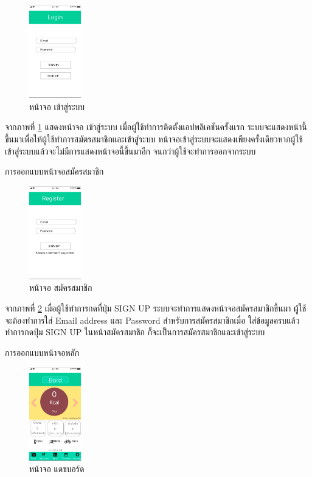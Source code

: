 				\begin{figure}[H]
					\centering
					\includegraphics[width=0.2\textwidth]{Figures/3/UIDESIGN/1}
					\caption{หน้าจอ เข้าสู่ระบบ}
					\label{Fig:1}
				\end{figure}
				จากภาพที่ \ref{Fig:1} แสดงหน้าจอ เข้าสู่ระบบ เมื่อผู้ใช้ทำการติดตั้งแอปพลิเคชันครั้งแรก ระบบจะแสดงหน้านี้ขึ้นมาเพื่อให้ผู้ใช้ทำการสมัตรสมาชิกและเข้าสู่ระบบ
				หน้าจอเข้าสู่ระบบจะแสดงเพียงครั้งเดียวหากผู้ใช้เข้าสู่ระบบแล้วจะไม่มีการแสดงหน้าจอนี้ขึ้นมาอีก จนกว่าผู้ใช้จะทำการออกจากระบบ
\item การออกแบบหน้าจอสมัครสมาชิก 
	\begin{figure}[H]
					\centering
					\includegraphics[width=0.2\textwidth]{Figures/3/UIDESIGN/2}
					\caption{หน้าจอ สมัครสมาชิก}
					\label{Fig:2}
				\end{figure}
				จากภาพที่ \ref{Fig:2} เมื่อผู้ใช้ทำการกดที่ปุ่ม SIGN UP ระบบจะทำการแสดงหน้าจอสมัครสมาชิกขึ้นมา ผู้ใช้จะต้องทำการใส่ Email address และ Password สำหรับการสมัครสมาชิกเมื่อ
				ใส่ข้อมูลครบแล้วทำการกดปุ่ม SIGN UP ในหน้าสมัครสมาชิก ก็จะเป็นการสมัครสมาชิกและเข้าสู่ระบบ
\item การออกแบบหน้าจอหลัก 
				\begin{figure}[H]
								\centering
								\includegraphics[width=0.2\textwidth]{Figures/3/UIDESIGN/5}
								\caption{หน้าจอ แดชบอร์ด}
								\label{Fig:5}
							\end{figure}

